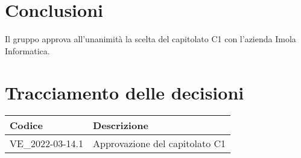 \documentclass[12pt, a4paper,table]{article}
\begin{document}
	\section{Conclusioni}
	Il gruppo approva all'unanimità la scelta del capitolato C1 con l'azienda Imola Informatica.
	\newpage
	
	\section*{Tracciamento delle decisioni}
	\renewcommand{\arraystretch}{2} %
	\begin{tabular}{ |m{8em}|m{30em}| }
		\hline
		\textbf{Codice} & \textbf{Descrizione} \\
		\hline
		VE\_2022-03-14.1 & Approvazione del capitolato C1 \\
		\hline
	\end{tabular}
\end{document}
